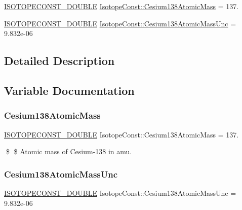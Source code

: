\begin{DoxyCompactItemize}
\item 
\mbox{\hyperlink{group___isotope_const-_macros_ga8f45a7272ce02c0b4c65c44636ed719a}{I\+S\+O\+T\+O\+P\+E\+C\+O\+N\+S\+T\+\_\+\+D\+O\+U\+B\+LE}} \mbox{\hyperlink{group___isotope_const-_cesium-_cs138_gaba950c372fb0e96a9dd4dd72f08b142a}{Isotope\+Const\+::\+Cesium138\+Atomic\+Mass}} = 137.
\item 
\mbox{\hyperlink{group___isotope_const-_macros_ga8f45a7272ce02c0b4c65c44636ed719a}{I\+S\+O\+T\+O\+P\+E\+C\+O\+N\+S\+T\+\_\+\+D\+O\+U\+B\+LE}} \mbox{\hyperlink{group___isotope_const-_cesium-_cs138_ga201c35fc1fc6ee786f1dc1d7eb82fdb3}{Isotope\+Const\+::\+Cesium138\+Atomic\+Mass\+Unc}} = 9.\+832e-\/06
\end{DoxyCompactItemize}


\subsection{Detailed Description}


\subsection{Variable Documentation}
\mbox{\label{group___isotope_const-_cesium-_cs138_gaba950c372fb0e96a9dd4dd72f08b142a}} 
\subsubsection{\texorpdfstring{Cesium138\+Atomic\+Mass}{Cesium138AtomicMass}}
{\footnotesize\ttfamily \mbox{\hyperlink{group___isotope_const-_macros_ga8f45a7272ce02c0b4c65c44636ed719a}{I\+S\+O\+T\+O\+P\+E\+C\+O\+N\+S\+T\+\_\+\+D\+O\+U\+B\+LE}} Isotope\+Const\+::\+Cesium138\+Atomic\+Mass = 137.}

\$ \$ Atomic mass of Cesium-\/138 in amu. \mbox{\label{group___isotope_const-_cesium-_cs138_ga201c35fc1fc6ee786f1dc1d7eb82fdb3}} 
\subsubsection{\texorpdfstring{Cesium138\+Atomic\+Mass\+Unc}{Cesium138AtomicMassUnc}}
{\footnotesize\ttfamily \mbox{\hyperlink{group___isotope_const-_macros_ga8f45a7272ce02c0b4c65c44636ed719a}{I\+S\+O\+T\+O\+P\+E\+C\+O\+N\+S\+T\+\_\+\+D\+O\+U\+B\+LE}} Isotope\+Const\+::\+Cesium138\+Atomic\+Mass\+Unc = 9.\+832e-\/06}

